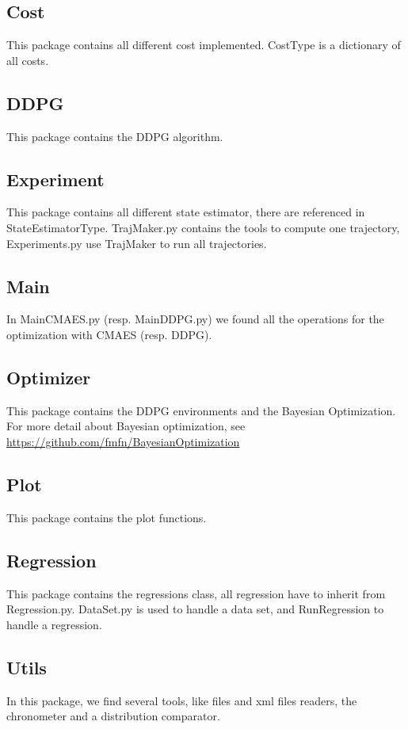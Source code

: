 \documentclass[a4paper]{article}
\begin{document}
\subsection{Cost}
This package contains all different cost implemented. CostType is a dictionary of all costs.

\subsection{DDPG}
This package contains the DDPG algorithm.

\subsection{Experiment}
This package contains all different state estimator, there are referenced in StateEstimatorType. 
TrajMaker.py contains the tools to compute one trajectory, Experiments.py use TrajMaker to run all trajectories.

\subsection{Main}
In MainCMAES.py (resp. MainDDPG.py) we found all the operations for the optimization with CMAES (resp. DDPG).

\subsection{Optimizer}
This package contains the DDPG environments and the Bayesian Optimization. For more detail about Bayesian optimization, see 
\url{https://github.com/fmfn/BayesianOptimization} 

\subsection{Plot}
This package contains the plot functions.

\subsection{Regression}
This package contains the regressions class, all regression have to inherit from Regression.py.
DataSet.py is used to handle a data set, and RunRegression to handle a regression.

\subsection{Utils}
In this package, we find several tools, like files and xml files readers, the chronometer and a distribution comparator.
\end{document}
